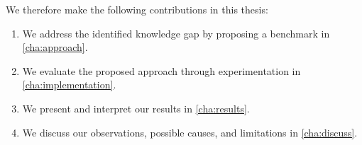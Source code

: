 We therefore make the following contributions in this thesis:
\begin{enumerate}
	\item We address the identified knowledge gap by proposing a benchmark in \cref{cha:approach}.
	\item We evaluate the proposed approach through experimentation in \cref{cha:implementation}.
	\item We present and interpret our results in \cref{cha:results}.
	\item We discuss our observations, possible causes, and limitations in \cref{cha:discuss}.
\end{enumerate}